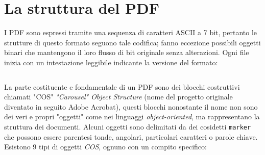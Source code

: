 \section{La struttura del PDF}
I PDF sono espressi tramite una sequenza di caratteri ASCII a 7 bit, pertanto le strutture di questo formato seguono tale codifica; fanno eccezione possibili oggetti binari che mantengono il loro flusso di bit originale senza alterazioni.
Ogni file inizia con un intestazione leggibile indicante la versione del formato:
\begin{center}
\begin{lstlisting}[language=C]
			%PDF-1.4	
\end{lstlisting}
\end{center}
La parte costituente e fondamentale di un PDF sono dei blocchi costruttivi chiamati "COS" \textit{"Carousel" Object Structure} (nome del progetto originale diventato in seguito Adobe Acrobat), questi blocchi nonostante il nome non sono dei veri e propri "oggetti" come nei linguaggi \textit{object-oriented}, ma rappresentano la struttura dei documenti.
Alcuni oggetti sono delimitati da dei cosidetti \texttt{marker} che possono essere parentesi tonde, angolari, particolari caratteri o parole chiave.
Esistono 9 tipi di oggetti \textit{COS}, ognuno con un compito specifico:
